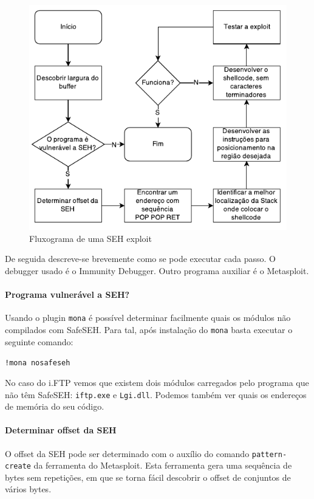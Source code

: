 \documentclass[a4paper]{article}
\begin{document}
\begin{figure}[h]
        \centering
        \includegraphics[width=\linewidth]{fc1}
        \caption{Fluxograma de uma SEH exploit}
        \label{fig:flowchart1}
\end{figure}

De seguida descreve-se brevemente como se pode executar cada passo. O debugger usado é o Immunity Debugger. Outro programa auxiliar é o Metasploit.

\paragraph*{Programa vulnerável a SEH?} Usando o plugin \texttt{mona} é possível determinar facilmente quais os módulos não compilados com SafeSEH. Para tal, após instalação do \texttt{mona} basta executar o seguinte comando:

	\texttt{!mona nosafeseh}

No caso do i.FTP vemos que existem dois módulos carregados pelo programa que não têm SafeSEH: \texttt{iftp.exe} e \texttt{Lgi.dll}. Podemos também ver quais os endereços de memória do seu código.

\paragraph*{Determinar offset da SEH} O offset da SEH pode ser determinado com o auxílio do comando \texttt{pattern-create} da ferramenta do Metasploit. Esta ferramenta gera uma sequência de bytes sem repetições, em que se torna fácil descobrir o offset de conjuntos de vários bytes.
\end{document}
